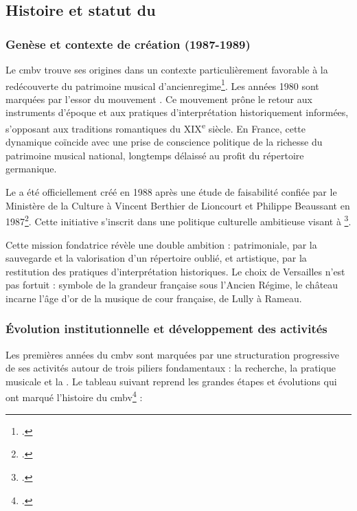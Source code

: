 \subsection{Histoire et statut du }

\subsubsection{Genèse et contexte de création (1987-1989)}

Le \gls{cmbv} trouve ses origines dans un contexte particulièrement favorable à la redécouverte du patrimoine musical d'\gls{ancienregime}\footcite{buchernicolasSciencesPartageesPuisqu2022}. Les années 1980 sont marquées par l'essor du mouvement . Ce mouvement prône le retour aux instruments d'époque et aux pratiques d'interprétation historiquement informées, s'opposant aux traditions romantiques du XIX\textsuperscript{e} siècle. En France, cette dynamique coïncide avec une prise de conscience politique de la richesse du patrimoine musical national, longtemps délaissé au profit du répertoire germanique.

Le  a été officiellement créé en 1988 après une étude de faisabilité confiée par le Ministère de la Culture à Vincent Berthier de Lioncourt et Philippe Beaussant en 1987\footcite{CentreMusiqueBaroque}. Cette initiative s'inscrit dans une politique culturelle ambitieuse visant à \footcite{CentreMusiqueBaroque}.

Cette mission fondatrice révèle une double ambition : patrimoniale, par la sauvegarde et la valorisation d'un répertoire oublié, et artistique, par la restitution des pratiques d'interprétation historiques. Le choix de Versailles n'est pas fortuit : symbole de la grandeur française sous l'Ancien Régime, le château incarne l'âge d'or de la musique de cour française, de Lully à Rameau.

\subsubsection{Évolution institutionnelle et développement des activités}

Les premières années du \gls{cmbv} sont marquées par une structuration progressive de ses activités autour de trois piliers fondamentaux : la recherche, la pratique musicale et la . Le tableau suivant reprend les grandes étapes et évolutions qui ont marqué l'histoire du \gls{cmbv}\footcite{CentreMusiqueBaroque} :

